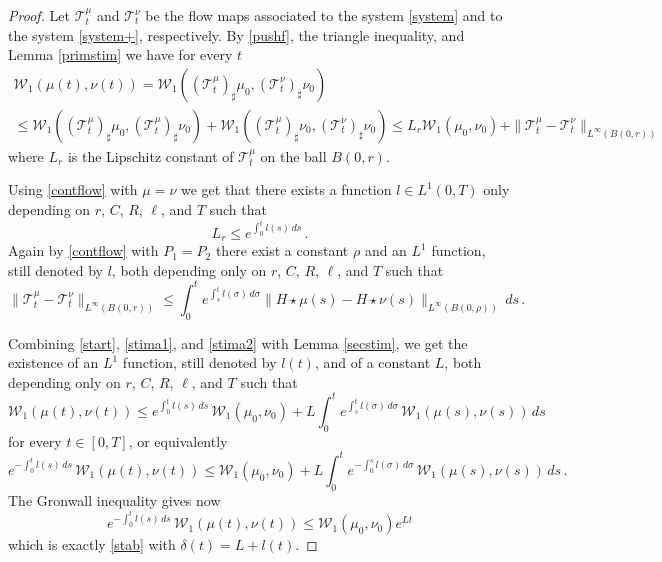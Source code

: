 \documentclass[11pt]{article}
\theoremstyle{plain}
\theoremstyle{definition}
\theoremstyle{remark}
\numberwithin{equation}{section}
\newcommand{\WW}{{\mathcal W}_1}
\begin{document}
\begin{proof}
Let  ${\mathcal T}^\mu_t$ and ${\mathcal T}^\nu_t$ be the flow maps associated to the system \eqref{system} and to the system \eqref{system+}, respectively.
By \eqref{pushf}, the triangle inequality, and Lemma \ref{primstim} we have for every $t$
\begin{equation}\label{start}
\begin{array}{c}
\WW(\mu(t), \nu(t))=\WW(({\mathcal T}^\mu_t)_\sharp \mu_0, ({\mathcal T}^\nu_t)_\sharp \nu_0)  \\[5pt]
\le \WW(({\mathcal T}^\mu_t)_\sharp \mu_0, ({\mathcal T}^\mu_t)_\sharp \nu_0) + \WW(({\mathcal T}^\mu_t)_\sharp \nu_0, ({\mathcal T}^\nu_t)_\sharp \nu_0)\le L_r \WW(\mu_0, \nu_0)+\|{\mathcal T}^\mu_t-{\mathcal T}^\nu_t\|_{L^\infty(B(0,r))}
\end{array}
\end{equation}
where $L_r$ is the Lipschitz constant of ${\mathcal T}^\mu_t$ on the ball $B(0,r)$.

Using \eqref{contflow} with $\mu=\nu$ we get that there exists a function $l\in L^1(0,T)$ only depending on $r$, $C$, $R$,  $\ell$, and $T$ such that
\begin{equation}\label{stima1}
L_r \le e^{\int_0^t l(s)\,ds}\,.
\end{equation}
Again by \eqref{contflow} with $P_1= P_2$ there exist a constant $\rho$ and an $L^1$ function, still denoted by $l$, both depending only on $r$, $C$, $R$,  $\ell$, and $T$ such that
\begin{equation}\label{stima2}
\|{\mathcal T}^\mu_t-{\mathcal T}^\nu_t\|_{L^\infty(B(0,r))}\le \int_0^t e^{\int_s^t l(\sigma)\,d\sigma}\|H\star \mu(s)-H\star \nu(s)\|_{L^\infty(B(0,\rho))}\,ds\,.
\end{equation}

Combining \eqref{start}, \eqref{stima1}, and \eqref{stima2} with Lemma \ref{secstim}, we get the existence of an $L^1$ function, still denoted by $l(t)$, and of a constant $L$, both depending only on $r$, $C$, $R$,  $\ell$, and $T$ such that
$$
\WW(\mu(t), \nu(t))\le e^{\int_0^t l(s)\,ds} \,\WW(\mu_0, \nu_0)+ L \int_0^t e^{\int_s^t l(\sigma)\,d\sigma}\, \WW(\mu(s), \nu(s)) \,ds
$$
for every $t \in [0, T]$, or equivalently
$$
e^{-{\int_0^t l(s)\,ds}}\,\WW(\mu(t), \nu(t))\le  \WW(\mu_0, \nu_0)+ L \int_0^t e^{-{\int_0^s l(\sigma)\,d\sigma}}\, \WW(\mu(s), \nu(s)) \,ds\,.
$$
The Gronwall inequality gives now
$$
e^{-{\int_0^t l(s)\,ds}}\,\WW(\mu(t), \nu(t))\le  \WW(\mu_0, \nu_0)e^{Lt}
$$
which is exactly \eqref{stab} with $\delta(t)= L+l(t)$.
\end{proof}
\end{document}
